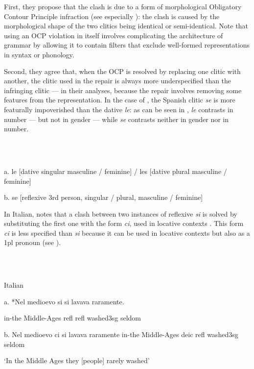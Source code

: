 \documentclass[output=paper,colorlinks,citecolor=brown]{./langscibook}
\begin{document}
First, they propose that the clash is due to a form of morphological Obligatory Contour Principle infraction (see especially \citealt{Nevins2012}): the clash is caused by the morphological shape of the two clitics being identical or semi-identical. Note that using an OCP violation in itself involves complicating the architecture of grammar by allowing it to contain filters that exclude well-formed representations in syntax or phonology.

Second, they agree that, when the OCP is resolved by replacing one clitic with another, the clitic used in the repair is always more underspecified than the infringing clitic — in their analyses, because the repair involves removing some features from the representation. In the case of , the Spanish clitic \textit{se} is more featurally impoverished than the dative \textit{le}: as can be seen in , \textit{le} contrasts in number — but not in gender — while \textit{se} contrasts neither in gender nor in number.

\ea%
    \label{ex:key:3}
    \gll\\
        \\
    \glt
    \z

          a. le [dative singular masculine / feminine]  / les [dative   plural masculine / feminine]

  b. se [reflexive 3rd person, singular / plural, masculine /   feminine]

In Italian, \citet{Pescarini2007} notes that a clash between two instances of reflexive \textit{si} is solved by substituting the first one with the form \textit{ci}, used in locative contexts . This form \textit{ci} is less specified than \textit{si} because it can be used in locative contexts but also as a 1pl pronoun (see \citealt{Ferrazzano2003}).

\ea%
    \label{ex:key:4}
    \gll\\
        \\
    \glt
    \z

          Italian 

  a. *Nel medioevo   si   si   lavava         raramente.

              in-the Middle-Ages refl    refl  washed3sg seldom  

  b. Nel medioevo  ci  si  lavava         raramente          in-the Middle-Ages  deic  refl  washed3sg seldom  

  ‘In the Middle Ages they [people] rarely washed’
\end{document}
